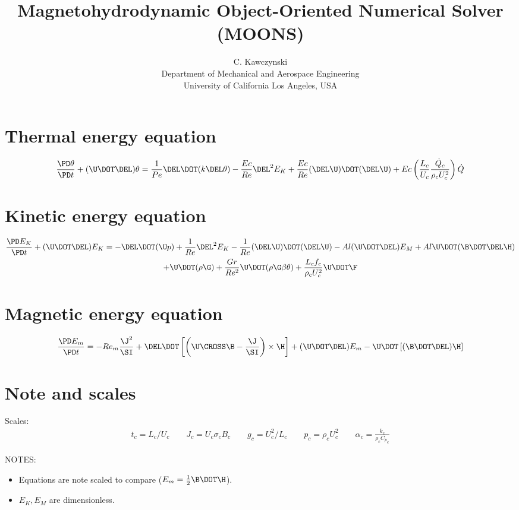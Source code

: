 \documentclass[11pt]{article}
\begin{document}
\doublespacing
\title{Magnetohydrodynamic Object-Oriented Numerical Solver (MOONS)}
\author{C. Kawczynski \\
Department of Mechanical and Aerospace Engineering \\
University of California Los Angeles, USA\\
}
\Large

\section{Thermal energy equation}
\begin{equation}
	\frac{\PD \theta}{\PD t}
	+ (\U \DOT \DEL) \theta
	= \frac{1}{Pe} \DEL \DOT (k \DEL \theta)
	- \frac{Ec}{Re} \DEL^2 E_K
	+ \frac{Ec}{Re} (\DEL \U) \DOT (\DEL \U)
	+ Ec \left( \frac{L_c}{U_c} \frac{\dot{Q}_c}{\rho_c U_c^2} \right) \dot{Q}
\end{equation}
\section{Kinetic energy equation}
\begin{multline}
	\frac{\PD E_K}{\PD t}
	+ (\U \DOT \DEL) E_K
	=
	- \DEL \DOT (\U p)
	+ \frac{1}{Re} \DEL^2 E_K
	- \frac{1}{Re} (\DEL \U) \DOT (\DEL \U)
	- Al (\U \DOT \DEL) E_M
	+ Al \U \DOT (\B \DOT \DEL \H) \\
	+ \U \DOT (\rho \G)
	+ \frac{Gr}{Re^2} \U \DOT (\rho \G \beta \theta)
	+ \frac{L_c f_c}{\rho_c U_c^2} \U \DOT \F
\end{multline}

\section{Magnetic energy equation}
\begin{equation}
	\frac{\PD E_m}{\PD t} =
	- Re_m \frac{{\J}^2}{\SI}
	+ \DEL \DOT \left[\left(\U \CROSS \B - \frac{\J}{\SI} \right) \times \H \right]
	+ (\U \DOT \DEL) E_m
	- \U \DOT \left[(\B \DOT \DEL) \H \right]
\end{equation}


\section{Note and scales}
Scales:
\begin{equation}\begin{aligned}
	t_c = L_c/ U_c \qquad
	J_c = U_c \sigma_c B_c \qquad
	g_c = U_c^2/L_c \qquad
	p_c = \rho_c U_c^2 \qquad
	\alpha_c = \frac{k_c}{\rho_c {C_p}_c}
\end{aligned}\end{equation}

NOTES:
\begin{itemize}
	\item Equations are note scaled to compare ($E_m = \frac{1}{2} \B \DOT \H$).
	\item $E_K, E_M$ are dimensionless.
\end{itemize}
\end{document}
